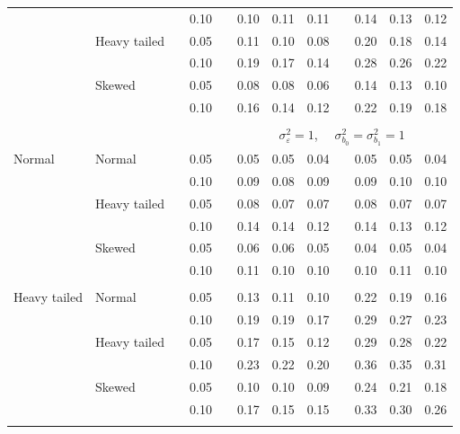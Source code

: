 \documentclass[12pt]{article} %
\begin{document}
\begin{table}[ht]
\begin{scriptsize}
\begin{center}
\begin{tabular}{ll p{.1cm} c p{.1cm} rrr p{.1cm} rrr}
             &              && 0.10 &&  0.10 & 0.11 & 0.11 && 0.14 & 0.13 & 0.12 \\ 
             & Heavy tailed && 0.05 &&  0.11 & 0.10 & 0.08 && 0.20 & 0.18 & 0.14 \\ 
             &              && 0.10 &&  0.19 & 0.17 & 0.14 && 0.28 & 0.26 & 0.22 \\ 
             & Skewed       && 0.05 &&  0.08 & 0.08 & 0.06 && 0.14 & 0.13 & 0.10 \\ 
             &              && 0.10 &&  0.16 & 0.14 & 0.12 && 0.22 & 0.19 & 0.18 \\ 

&&&&&&&&&&&\\
& && && \multicolumn{7}{c}{$\sigma_{\varepsilon}^2 = 1$, \ \ $\sigma_{b_0}^2 = \sigma_{b_1}^2 = 1$} \\ \cline{6-12}
\rowcolor{gray!20}Normal       & Normal       && 0.05 &&  0.05 & 0.05 & 0.04 && 0.05 & 0.05 & 0.04 \\ 
\rowcolor{gray!20}             &              && 0.10 &&  0.09 & 0.08 & 0.09 && 0.09 & 0.10 & 0.10 \\ 
\rowcolor{gray!20}             & Heavy tailed && 0.05 &&  0.08 & 0.07 & 0.07 && 0.08 & 0.07 & 0.07 \\ 
\rowcolor{gray!20}             &              && 0.10 &&  0.14 & 0.14 & 0.12 && 0.14 & 0.13 & 0.12 \\ 
\rowcolor{gray!20}             & Skewed       && 0.05 &&  0.06 & 0.06 & 0.05 && 0.04 & 0.05 & 0.04 \\ 
\rowcolor{gray!20}             &              && 0.10 &&  0.11 & 0.10 & 0.10 && 0.10 & 0.11 & 0.10 \\ 
             &&&&&&&&&&&\\
Heavy tailed & Normal       && 0.05 &&  0.13 & 0.11 & 0.10 && 0.22 & 0.19 & 0.16 \\ 
             &              && 0.10 &&  0.19 & 0.19 & 0.17 && 0.29 & 0.27 & 0.23 \\ 
             & Heavy tailed && 0.05 &&  0.17 & 0.15 & 0.12 && 0.29 & 0.28 & 0.22 \\ 
             &              && 0.10 &&  0.23 & 0.22 & 0.20 && 0.36 & 0.35 & 0.31 \\ 
             & Skewed       && 0.05 &&  0.10 & 0.10 & 0.09 && 0.24 & 0.21 & 0.18 \\ 
             &              && 0.10 &&  0.17 & 0.15 & 0.15 && 0.33 & 0.30 & 0.26 \\ 
             &&&&&&&&&&&\\

\end{tabular}
\end{center}
\end{scriptsize}
\end{table}
\end{document}
